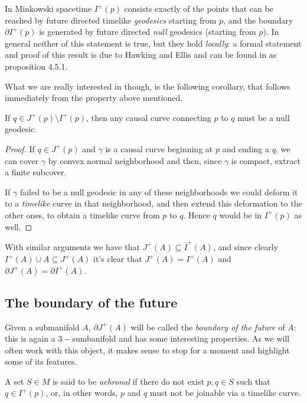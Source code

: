 In Minkowski spacetime \(I^+(p)\) consists exactly of the points that can be reached by future directed timelike \emph{geodesics} starting from \(p\), and the boundary \(\partial I^+(p)\) is generated by future directed \emph{null} geodesics (starting from \(p\)). In general neither of this statement is true, but they hold \emph{locally}: a formal statement and proof of this result is due to Hawking and Ellis and can be found in \cite{hawking1973large} as proposition \(4.5.1\).

What we are really interested in though, is the following corollary, that follows immediately from the property above mentioned.
\begin{corollary}
	If \(q \in J^+(p) \setminus I^+(p)\), then any causal curve connecting \(p\) to \(q\) must be a null geodesic.
\end{corollary}

\begin{proof}
	If \( q \in J^+(p)\) and \(\gamma\) is a causal curve beginning at \(p\) and ending a \(q\), we can cover \(\gamma\) by convex normal neighborhood and then, since \(\gamma\) is compact, extract a finite subcover.
	
	If \(\gamma\) failed to be a null geodesic in any of these neighborhoods we could deform it to a \emph{timelike} curve in that neighborhood, and then extend this deformation to the other ones, to obtain a timelike curve from \(p\) to \(q\). Hence \(q\) would be in \(I^+(p)\) as well.
\end{proof}

With similar arguments we have that \(J^+(A) \subseteq \bar{I}^+(A)\), and since clearly \(I^+(A) \cup A \subseteq J^+(A)\) it's clear that \(\overline{J^+(A)} = \overline{I^+(A)}\) and \(\partial J^+(A) = \partial I^+(A)\).

\subsection{The boundary of the future}
Given a submanifold \(A\), \(\partial J^+(A)\) will be called the \emph{boundary of the future} of \(A\): this is again a \(3-\)sumbanifold and has some interesting properties. As we will often work with this object, it makes sense to stop for a moment and highlight some of its features.

\begin{definition}
	A set \(S\in M\) is said to be \emph{achronal} if there do not exist \(p, q \in S\) such that \(q\in I^+(p)\), or, in other words, \(p\) and \(q\) must not be joinable via a timelike curve. 
\end{definition}

